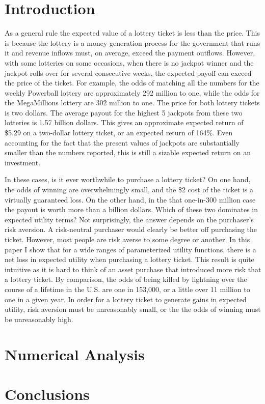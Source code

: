 \documentclass[letterpaper,12pt]{article}
\numberwithin{equation}{section}
\numberwithin{figure}{section}
\numberwithin{table}{section}
\begin{document}
\begin{spacing}{1.5}

\section{Introduction} \label{sec_intro}

	As a general rule the expected value of a lottery ticket is less than the price.  This is because the lottery is a money-generation process for the government that runs it and revenue inflows must, on average, exceed the payment outflows.  However, with some lotteries on some occasions, when there is no jackpot winner and the jackpot rolls over for several consecutive weeks, the expected payoff can exceed the price of the ticket.  For example, the odds of matching all the numbers for the weekly Powerball lottery are approximately 292 million to one, while the odds for the MegaMillions lottery are 302 million to one.  The price for both lottery tickets is two dollars.  The average payout for the highest 5 jackpots from these two lotteries is 1.57 billion dollars.  This gives an approximate expected return of \$5.29 on a two-dollar lottery ticket, or an expected return of 164\%.  Even accounting for the fact that the present values of jackpots are substantially smaller than the numbers reported, this is still a sizable expected return on an investment.

	In these cases, is it ever worthwhile to purchase a lottery ticket?  On one hand, the odds of winning are overwhelmingly small, and the \$2 cost of the ticket is a virtually guaranteed loss.  On the other hand, in the that one-in-300 million case the payout is worth more than a billion dollars.  Which of these two dominates in expected utility terms?  Not surprisingly, the answer depends on the purchaser's risk aversion.  A risk-neutral purchaser would clearly be better off purchasing the ticket.  However, most people are risk averse to some degree or another.  In this paper I show that for a wide ranges of parameterized utility functions, there is a net loss in expected utility when purchasing a lottery ticket.  This result is quite intuitive as it is hard to think of an asset purchase that introduced more risk that a lottery ticket.  By comparison, the odds of being killed by lightning over the course of a lifetime in the U.S. are one in 153,000, or a little over 11 million to one in a given year.  In order for a lottery ticket to generate gains in expected utility, risk aversion must be unreasonably small, or the the odds of winning must be unreasonably high.

\section{Numerical Analysis} \label{sec_numer}


\section{Conclusions} \label{sec_concl}
	

%

\end{spacing}
\end{document}
